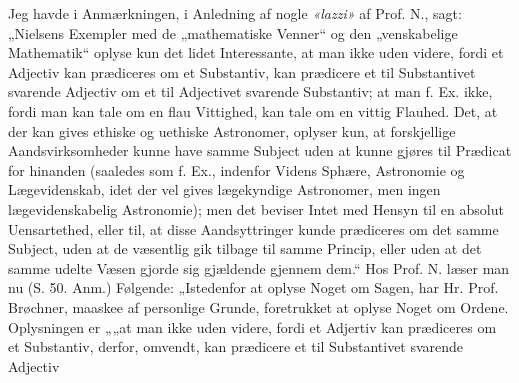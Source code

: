 \documentclass[12pt,a4paper]{book}
\newcommand{\opage}[1]{\marginnote{\footnotesize\textit{[#1]}}}
\begin{document}
Jeg havde i Anmærkningen, i Anledning af nogle \textit{«lazzi»} af Prof. N.,
sagt: „Nielsens Exempler med de „mathematiske Venner“ og den „venskabelige
Mathematik“ oplyse kun det lidet Interessante, at man ikke uden videre, fordi et
Adjectiv kan prædiceres om et Substantiv, kan prædicere et til Substantivet
svarende Adjectiv om et til Adjectivet svarende Substantiv; at man f. Ex. ikke,
fordi man kan tale om en flau Vittighed, kan tale om en vittig Flauhed. Det,
\opage{20} at der kan gives ethiske og uethiske Astronomer, oplyser kun, at forskjellige
Aandsvirksomheder kunne have samme Subject uden at kunne gjøres til Prædicat for
hinanden (saaledes som f. Ex., indenfor Videns Sphære, Astronomie og
Lægevidenskab, idet der vel gives lægekyndige Astronomer, men ingen
lægevidenskabelig Astronomie); men det beviser Intet med Hensyn til en absolut
Uensartethed, eller til, at disse Aandsyttringer kunde prædiceres om det samme
Subject, uden at de væsentlig gik tilbage til samme Princip, eller uden at det
samme udelte Væsen gjorde sig gjældende gjennem dem.“ Hos Prof. N. læser man nu
(S. 50. Anm.) Følgende: „Istedenfor at oplyse Noget om Sagen, har Hr. Prof.
Brøchner, maaskee af personlige Grunde, foretrukket at oplyse Noget om Ordene.
Oplysningen er „„at man ikke uden videre, fordi et Adjertiv kan prædiceres om et
Substantiv, derfor, omvendt, kan prædicere et til Substantivet svarende Adjectiv
\end{document}
